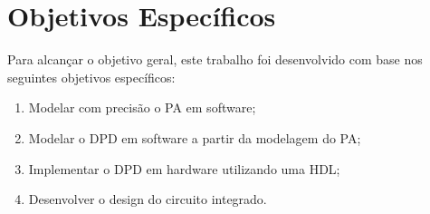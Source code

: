 \section{Objetivos Específicos}

Para alcançar o objetivo geral, este trabalho foi desenvolvido com base nos seguintes objetivos específicos:

\begin{enumerate}
    \item Modelar com precisão o PA em software;
    \item Modelar o DPD em software a partir da modelagem do PA;
    \item Implementar o DPD em hardware utilizando uma HDL;
    \item Desenvolver o design do circuito integrado.
\end{enumerate}

